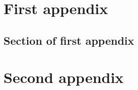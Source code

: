 \documentclass{mproj}
\begin{document}

\appendix %
\chapter{First appendix}
\label{app: firstapp}

\section{Section of first appendix}

\chapter{Second appendix}




\nocite{*}
\end{document}
